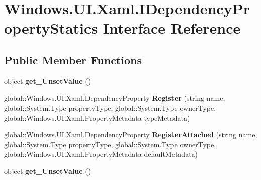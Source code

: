 \hypertarget{interface_windows_1_1_u_i_1_1_xaml_1_1_i_dependency_property_statics}{}\section{Windows.\+U\+I.\+Xaml.\+I\+Dependency\+Property\+Statics Interface Reference}
\label{interface_windows_1_1_u_i_1_1_xaml_1_1_i_dependency_property_statics}
\subsection*{Public Member Functions}
\begin{DoxyCompactItemize}
\item 
\mbox{\label{interface_windows_1_1_u_i_1_1_xaml_1_1_i_dependency_property_statics_aa28828abf71475e63362031e6a61c8fa}} 
object {\bfseries get\+\_\+\+Unset\+Value} ()
\item 
\mbox{\label{interface_windows_1_1_u_i_1_1_xaml_1_1_i_dependency_property_statics_a4e706c1d69fb6429a9f6fe61c7780e79}} 
global\+::\+Windows.\+U\+I.\+Xaml.\+Dependency\+Property {\bfseries Register} (string name, global\+::\+System.\+Type property\+Type, global\+::\+System.\+Type owner\+Type, global\+::\+Windows.\+U\+I.\+Xaml.\+Property\+Metadata type\+Metadata)
\item 
\mbox{\label{interface_windows_1_1_u_i_1_1_xaml_1_1_i_dependency_property_statics_ae43bcad9ef0a0efab0a70609013e7b53}} 
global\+::\+Windows.\+U\+I.\+Xaml.\+Dependency\+Property {\bfseries Register\+Attached} (string name, global\+::\+System.\+Type property\+Type, global\+::\+System.\+Type owner\+Type, global\+::\+Windows.\+U\+I.\+Xaml.\+Property\+Metadata default\+Metadata)
\item 
\mbox{\label{interface_windows_1_1_u_i_1_1_xaml_1_1_i_dependency_property_statics_aa28828abf71475e63362031e6a61c8fa}} 
object {\bfseries get\+\_\+\+Unset\+Value} ()
\item 
\mbox{\label{interface_windows_1_1_u_i_1_1_xaml_1_1_i_dependency_property_statics_a4e706c1d69fb6429a9f6fe61c7780e79}} 

\end{DoxyCompactItemize}
